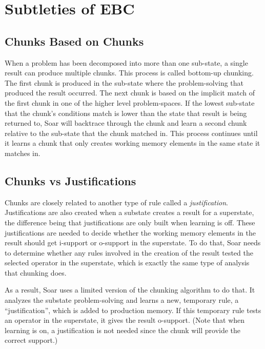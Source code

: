 \section{Subtleties of EBC}
\label{CHUNKING-subtleties}


\subsection{Chunks Based on Chunks}

When a problem has been decomposed into more than one sub-state, a single result can produce multiple chunks.  This process is called bottom-up chunking.  The first chunk is produced in the sub-state where the problem-solving that produced the result occurred.  The next chunk is based on the implicit match of the first chunk in one of the higher level problem-spaces.  If the lowest sub-state that the chunk's conditions match is lower than the state that result is being returned to, Soar will backtrace through the chunk and learn a second chunk relative to the sub-state that the chunk matched in.  This process continues until it learns a chunk that only creates working memory elements in the same state it matches in.

\subsection{Chunks vs Justifications}

Chunks are closely related to another type of rule called a \textit{justification}.  Justifications are also created when a substate creates a result for a superstate, the difference being that justifications are only built when learning is off.  These justifications are needed to decide whether the working memory elements in the result should get i-support or o-support in the superstate.  To do that, Soar needs to determine whether any rules involved in the creation of the result tested the selected operator in the superstate, which is exactly the same type of analysis that chunking does.

As a result, Soar uses a limited version of the chunking algorithm to do that.  It analyzes the substate problem-solving and learns a new, temporary rule, a ``justification'', which is added to production memory.  If this temporary rule tests an operator in the superstate, it gives the result o-support. (Note that when learning is on, a justification is not needed since the chunk will provide the correct support.)

